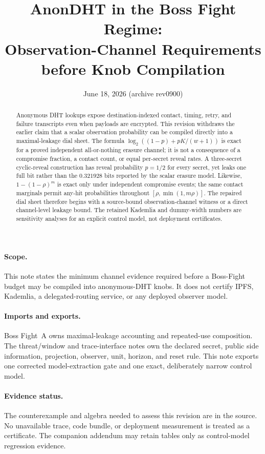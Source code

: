\documentclass[11pt]{article}
\title{AnonDHT in the Boss Fight Regime:\\ Observation-Channel Requirements before Knob Compilation}
\author{}
\date{June 18, 2026 (archive rev0900)}
\begin{document}
\maketitle

\begin{abstract}
Anonymous DHT lookups expose destination-indexed contact, timing, retry, and failure transcripts even when payloads are encrypted.
This revision withdraws the earlier claim that a scalar observation probability can be compiled directly into a maximal-leakage dial sheet.
The formula
\(\log_2((1-p)+pK/(w+1))\)
is exact for a proved independent all-or-nothing erasure channel; it is not a consequence of a compromise fraction, a contact count, or equal per-secret reveal rates.
A three-secret cyclic-reveal construction has reveal probability \(p=1/2\) for every secret, yet leaks one full bit rather than the \(0.321928\) bits reported by the scalar erasure model.
Likewise, \(1-(1-\rho)^m\) is exact only under independent compromise events; the same contact marginals permit any-hit probabilities throughout \([\rho,\min(1,m\rho)]\).
The repaired dial sheet therefore begins with a source-bound observation-channel witness or a direct channel-level leakage bound. The retained Kademlia and dummy-width numbers are sensitivity analyses for an explicit control model, not deployment certificates.
\end{abstract}

\paragraph{Scope.}
This note states the minimum channel evidence required before a Boss-Fight budget may be compiled into anonymous-DHT knobs. It does not certify IPFS, Kademlia, a delegated-routing service, or any deployed observer model.

\paragraph{Imports and exports.}
Boss Fight~A owns maximal-leakage accounting and repeated-use composition. The threat/window and trace-interface notes own the declared secret, public side information, projection, observer, unit, horizon, and reset rule. This note exports one corrected model-extraction gate and one exact, deliberately narrow control model.\cite{series:bossfightA,series:threatwindows,series:traceifaces}

\paragraph{Evidence status.}
The counterexample and algebra needed to assess this revision are in the source. No unavailable trace, code bundle, or deployment measurement is treated as a certificate. The companion addendum may retain tables only as control-model regression evidence.\cite{series:bossfightBaddendum}
\end{document}
